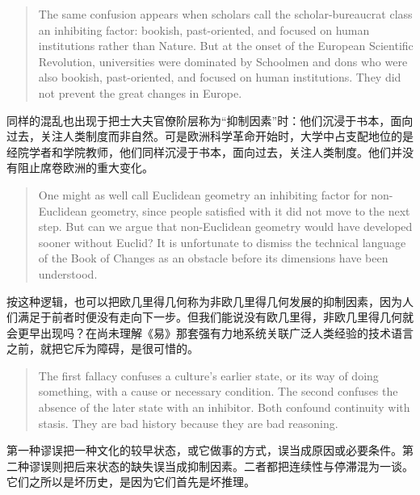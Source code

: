 \documentclass[UTF8,zihao=-4]{ctexart}
\newenvironment{enblock}
  {\par\smallskip\noindent{\scriptsize\bfseries English}\par\begin{quote}\small}
  {\end{quote}}
\newenvironment{zhblock}
  {\par\noindent{\scriptsize\bfseries 中文}\par}
  {\par\medskip}
\begin{document}
\begin{enblock}
The same confusion appears when scholars call the scholar-bureaucrat class an inhibiting factor: bookish, past-oriented, and focused on human institutions rather than Nature. But at the onset of the European Scientific Revolution, universities were dominated by Schoolmen and dons who were also bookish, past-oriented, and focused on human institutions. They did not prevent the great changes in Europe.
\end{enblock}
\begin{zhblock}
同样的混乱也出现于把士大夫官僚阶层称为“抑制因素”时：他们沉浸于书本，面向过去，关注人类制度而非自然。可是欧洲科学革命开始时，大学中占支配地位的是经院学者和学院教师，他们同样沉浸于书本，面向过去，关注人类制度。他们并没有阻止席卷欧洲的重大变化。
\end{zhblock}

\begin{enblock}
One might as well call Euclidean geometry an inhibiting factor for non-Euclidean geometry, since people satisfied with it did not move to the next step. But can we argue that non-Euclidean geometry would have developed sooner without Euclid? It is unfortunate to dismiss the technical language of the Book of Changes as an obstacle before its dimensions have been understood.
\end{enblock}
\begin{zhblock}
按这种逻辑，也可以把欧几里得几何称为非欧几里得几何发展的抑制因素，因为人们满足于前者时便没有走向下一步。但我们能说没有欧几里得，非欧几里得几何就会更早出现吗？在尚未理解《易》那套强有力地系统关联广泛人类经验的技术语言之前，就把它斥为障碍，是很可惜的。
\end{zhblock}

\begin{enblock}
The first fallacy confuses a culture's earlier state, or its way of doing something, with a cause or necessary condition. The second confuses the absence of the later state with an inhibitor. Both confound continuity with stasis. They are bad history because they are bad reasoning.
\end{enblock}
\begin{zhblock}
第一种谬误把一种文化的较早状态，或它做事的方式，误当成原因或必要条件。第二种谬误则把后来状态的缺失误当成抑制因素。二者都把连续性与停滞混为一谈。它们之所以是坏历史，是因为它们首先是坏推理。
\end{zhblock}
\end{document}
